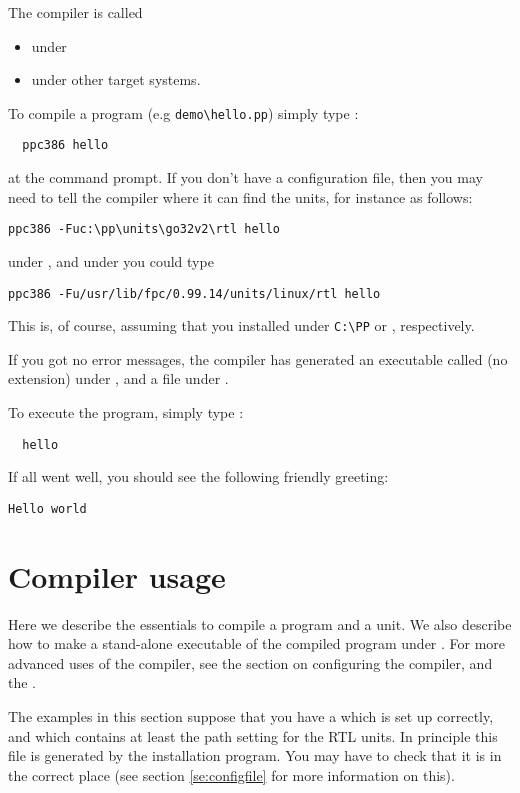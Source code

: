 \documentclass{book}
\begin{document}
The compiler is called
\begin{itemize}
\item {} under \linux
\item {} under other target systems.
\end{itemize}
To compile a program (e.g \verb|demo\hello.pp|) simply type :
\begin{verbatim}
  ppc386 hello
\end{verbatim}
at the command prompt. If you don't have a configuration file, then you may
need to tell the compiler where it can find the units, for instance as
follows:
\begin{verbatim}
ppc386 -Fuc:\pp\units\go32v2\rtl hello
\end{verbatim}
under \dos, and under \linux you could type
\begin{verbatim}
ppc386 -Fu/usr/lib/fpc/0.99.14/units/linux/rtl hello
\end{verbatim}
This is, of course, assuming that you installed under \verb|C:\PP| or
, respectively.

If you got no error messages, the compiler has generated an executable
called  (no extension) under \linux, and a file 
under \dos.

To execute the program, simply type :
\begin{verbatim}
  hello
\end{verbatim}
If all went well, you should see the following friendly greeting:
\begin{verbatim}
Hello world
\end{verbatim}

\chapter{Compiler usage}
\label{ch:Usage}

Here we describe the essentials to compile a program and a unit.
We also describe how to make a stand-alone executable of the
compiled program under \dos. For more advanced uses of the compiler,
see the section on configuring the compiler, and the
\progref{}.

The examples in this section suppose that you have a  which
is set up correctly, and which contains at least the path setting for the
RTL units. In principle this file is generated by the installation program.
You may have to check that it is in the correct place (see section
\ref{se:configfile} for more information on this).
\end{document}
